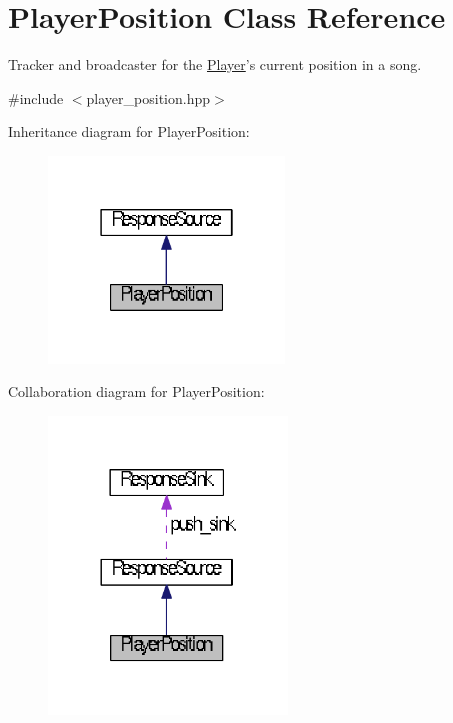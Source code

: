 \hypertarget{classPlayerPosition}{\section{Player\+Position Class Reference}
\label{classPlayerPosition}
}


Tracker and broadcaster for the \hyperlink{classPlayer}{Player}'s current position in a song.  




{\ttfamily \#include $<$player\+\_\+position.\+hpp$>$}



Inheritance diagram for Player\+Position\+:
\nopagebreak
\begin{figure}[H]
\begin{center}
\leavevmode
\includegraphics[width=178pt]{classPlayerPosition__inherit__graph}
\end{center}
\end{figure}


Collaboration diagram for Player\+Position\+:
\nopagebreak
\begin{figure}[H]
\begin{center}
\leavevmode
\includegraphics[width=180pt]{classPlayerPosition__coll__graph}
\end{center}
\end{figure}

